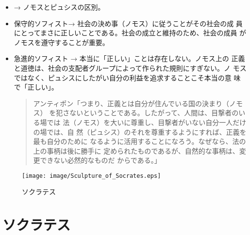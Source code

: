 \documentclass{jsarticle}
\begin{document}
\begin{itemize}
\item → ノモスとピュシスの区別。

\item 保守的ソフィスト→ 社会の決め事（ノモス）に従うことがその社会の成
  員にとってまさに正しいことである。社会の成立と維持のため、社会の成員
  がノモスを遵守することが重要。

\item 急進的ソフィスト → 本当に「正しい」ことは存在しない。ノモス上の
  正義と道徳は、社会の支配者グループによって作られた規則にすぎない。ノ
  モスではなく、ピュシスにしたがい自分の利益を追求することこそ本当の意
  味で「正しい」。


  \begin{quote}
    アンティポン「つまり、正義とは自分が住んでいる国の決まり（ノモス）
    を犯さないということである。したがって、人間は、目撃者のいる場では
    法（ノモス）を大いに尊重し、目撃者がいない自分一人だけの場では、自
    然（ピュシス）のそれを尊重するようにすれば、正義を最も自分のために
    なるように活用することになろう。なぜなら、法の上の事柄は後に勝手に
    定められたものであるが、自然的な事柄は、変更できない必然的なものだ
    からである。」\citep[p.9]{西洋倫理思想の形成1}
  \end{quote}


\end{itemize}


 \begin{wrapfigure}{r}{50mm}
   \begin{center}
     \texttt{[image: image/Sculpture\_of\_Socrates.eps]}
     \caption{ソクラテス}
   \end{center}
 \end{wrapfigure}


\section{ソクラテス}
\end{document}
